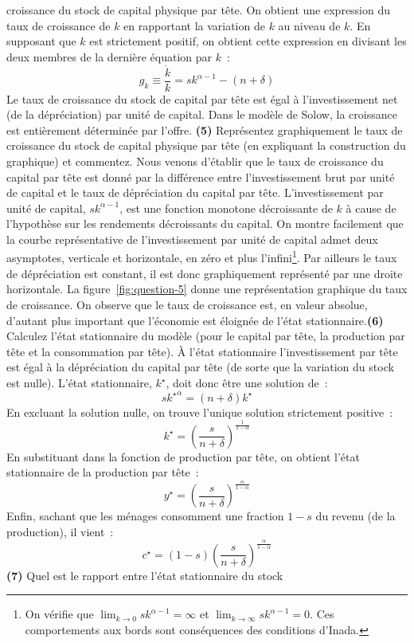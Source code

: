 \documentclass[10pt,a4paper,notitlepage]{article}
\newcommand{\question}[1]{\textbf{(#1)}}
\begin{document}
croissance  du stock  de capital  physique par  tête. {\color{red}  On
  obtient une expression du taux de croissance de $k$ en rapportant la
  variation  de  $k$ au  niveau  de  $k$.  En  supposant que  $k$  est
  strictement  positif, on  obtient cette  expression en  divisant les
  deux membres de la dernière équation par $k$ :
\[
g_k \equiv \frac{\dot k}{k} = sk^{\alpha-1} - (n+\delta)
\]
Le  taux  de croissance  du  stock  de capital  par  tête  est égal  à
l'investissement net (de  la dépréciation) par unité  de capital. Dans
le  modèle de  Solow,  la croissance  est  entièrement déterminée  par
l'offre.}    \question{5}  Représentez   graphiquement   le  taux   de
croissance du  stock de  capital physique par  tête (en  expliquant la
construction  du graphique)  et commentez.   {\color{red} Nous  venons
  d'établir que  le taux de croissance  du capital par tête  est donné
  par la différence  entre l'investissement brut par  unité de capital
  et le taux de dépréciation du capital par tête. L'investissement par
  unité  de  capital,  $sk^{\alpha-1}$,   est  une  fonction  monotone
  décroissante  de  $k$ à  cause  de  l'hypothèse sur  les  rendements
  décroissants  du  capital.   On  montre  facilement  que  la  courbe
  représentative de  l'investissement par unité de  capital admet deux
  asymptotes,   verticale   et   horizontale,    en   zéro   et   plus
  l'infini\footnote{On    vérifie     que    $\lim_{k\rightarrow    0}
    sk^{\alpha-1}   =    \infty$   et    $\lim_{k\rightarrow   \infty}
    sk^{\alpha-1} = 0$. Ces  comportements aux bords sont conséquences
    des conditions d'Inada.}. Par ailleurs le taux de dépréciation est
  constant,  il  est  donc  graphiquement représenté  par  une  droite
  horizontale. La figure~\ref{fig:question-5} donne une représentation
  graphique  du  taux  de  croissance.   On observe  que  le  taux  de
  croissance  est,  en valeur  absolue,  d'autant  plus important  que
  l'économie   est  éloignée   de  l'état   stationnaire.}\question{6}
Calculez l'état stationnaire  du modèle (pour le capital  par tête, la
production  par tête  et  la consommation  par  tête). {\color{red}  À
  l'état  stationnaire  l'investissement  par   tête  est  égal  à  la
  dépréciation du capital par tête (de sorte que la variation du stock
  est  nulle). L'état  stationnaire, $k^{\star}$,  doit donc  être une
  solution de :
\[
s\left.k^{\star}\right.^{\alpha} = (n+\delta)k^{\star}
\]
En excluant la solution nulle, on trouve l'unique solution strictement positive :
\[
k^{\star} = \left(\frac{s}{n+\delta}\right)^{\frac{1}{1-\alpha}}
\]
En substituant  dans la  fonction de production  par tête,  on obtient
l'état stationnaire de la production par tête :
\[
y^{\star} = \left(\frac{s}{n+\delta}\right)^{\frac{\alpha}{1-\alpha}}
\]
Enfin, sachant que les ménages consomment une fraction $1-s$ du revenu
(de la production), il vient :
\[
c^{\star} = (1-s)\left(\frac{s}{n+\delta}\right)^{\frac{\alpha}{1-\alpha}}
\]
}\question{7} Quel est  le rapport entre l'état  stationnaire du stock
\end{document}

